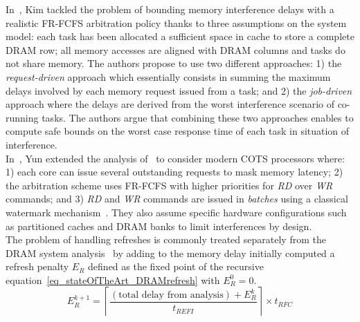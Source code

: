 \documentclass[main.tex]{subfiles}
\begin{document}
In~\cite{kim2014bounding}, Kim \etal tackled the problem of bounding memory interference delays with a realistic FR-FCFS arbitration policy thanks to three assumptions on the system model: each task has been allocated a sufficient space in cache to store a complete DRAM row;  all memory accesses are aligned with DRAM columns and  tasks do not share memory. The authors propose to use two different approaches: 1) the \emph{request-driven} approach which essentially consists in summing the maximum delays involved by each memory request issued from a task; and 2) the \emph{job-driven} approach where the delays are derived from the worst interference scenario of co-running tasks. The authors argue that combining these two approaches enables to compute safe bounds on the worst case response time of each task in situation of interference. \\

In~\cite{Yun2015}, Yun \etal extended the analysis of~\cite{kim2014bounding} to consider modern COTS processors where: 1) each core can issue several outstanding requests to mask memory latency; 2) the arbitration scheme uses FR-FCFS with higher priorities for \emph{RD} over \emph{WR} commands; and 3) \emph{RD} and \emph{WR} commands are issued in \emph{batches} using a classical watermark mechanism~\cite{Chatterjee2012}. They also assume specific hardware configurations such as partitioned caches and DRAM banks to limit interferences by design. \\

The problem of handling refreshes is commonly treated separately from the DRAM system analysis~\cite{Atanassov2001, Bhat2010, kim2014bounding} by adding to the memory delay initially computed a refresh penalty $E_R$ defined as the fixed point of the recursive equation~\ref{eq_stateOfTheArt_DRAMrefresh} with $E_R^0 = 0$.
\begin{equation}
    \label{eq_stateOfTheArt_DRAMrefresh}
    E_{R}^{k+1} = \left\lceil \frac{ (\text{total delay from analysis}) + E_R^k }{ t_{REFI} } \right\rceil \times t_{RFC}
\end{equation}
\end{document}
